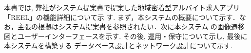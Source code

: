 本書では, 弊社がシステム提案書で提案した地域密着型アルバイト求人アプリ「REEL」の機能詳細について示
す. まず，本システムの概要について示す．なお，主張の根拠はシステム提案書を参照されたい．次に本システム
の画像遷移図とユーザーインターフェースを示す. その後, 運用・保守について示し, 最後に本システムを構築する
データベース設計とネットワーク設計について示す.